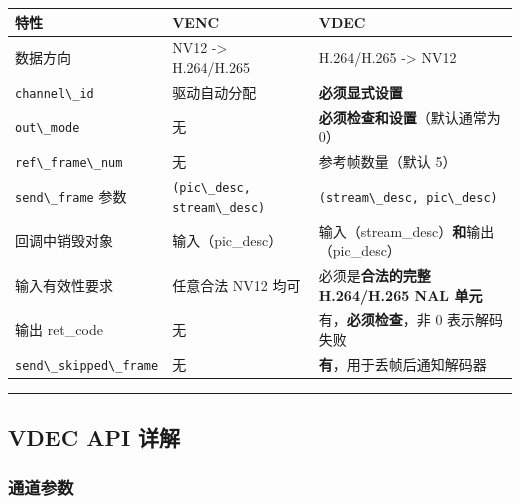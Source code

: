\begin{longtable}[]{@{}
  >{\raggedright\arraybackslash}p{}
  >{\raggedright\arraybackslash}p{}
  >{\raggedright\arraybackslash}p{}@{}}
\toprule\noalign{}
\begin{minipage}[b]{\linewidth}\raggedright
特性
\end{minipage} & \begin{minipage}[b]{\linewidth}\raggedright
VENC
\end{minipage} & \begin{minipage}[b]{\linewidth}\raggedright
VDEC
\end{minipage} \\
\midrule\noalign{}
\endhead
\bottomrule\noalign{}
\endlastfoot
数据方向 & NV12 -\textgreater{} H.264/H.265 & H.264/H.265
-\textgreater{} NV12 \\
\passthrough{\lstinline!channel\_id!} & 驱动自动分配 &
\textbf{必须显式设置} \\
\passthrough{\lstinline!out\_mode!} & 无 &
\textbf{必须检查和设置}（默认通常为 0） \\
\passthrough{\lstinline!ref\_frame\_num!} & 无 & 参考帧数量（默认 5） \\
\passthrough{\lstinline!send\_frame!} 参数 &
\passthrough{\lstinline!(pic\_desc, stream\_desc)!} &
\passthrough{\lstinline!(stream\_desc, pic\_desc)!} \\
回调中销毁对象 & 输入（pic\_desc） &
输入（stream\_desc）\textbf{和}输出（pic\_desc） \\
输入有效性要求 & 任意合法 NV12 均可 & 必须是\textbf{合法的完整
H.264/H.265 NAL 单元} \\
输出 ret\_code & 无 & 有，\textbf{必须检查}，非 0 表示解码失败 \\
\passthrough{\lstinline!send\_skipped\_frame!} & 无 &
\textbf{有}，用于丢帧后通知解码器 \\
\end{longtable}

\begin{center}\rule{0.5\linewidth}{0.5pt}\end{center}

\subsection{VDEC API 详解}\label{src-book-chapter6-h56}

\subsubsection{通道参数}\label{src-book-chapter6-h57}

